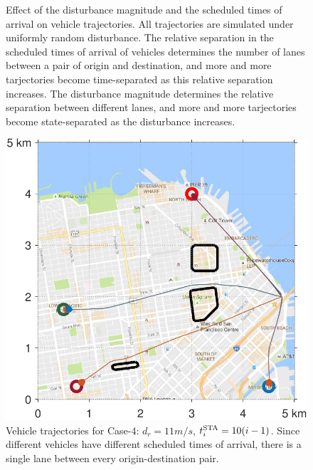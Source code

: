 \begin{figure}[!htb]
\begin{subfigure}{0.5\textwidth}
  \label{fig:sf_d11sep5}
\end{subfigure}%
\caption{Effect of the disturbance magnitude and the scheduled times of arrival on vehicle trajectories. All trajectories are simulated under uniformly random disturbance. The relative separation in the scheduled times of arrival of vehicles determines the number of lanes between a pair of origin and destination, and more and more tarjectories become time-separated as this relative separation increases. The disturbance magnitude determines the relative separation between different lanes, and more and more tarjectories become state-separated as the disturbance increases. }
\label{fig:trajectories_sf}
\end{figure}

\begin{figure}[t]
  \centering
  \includegraphics[width=\columnwidth]{figs/sf_d11sep10}
  \caption{Vehicle trajectories for Case-4: $d_r = 11m/s$, $t^\text{STA}_i = 10(i-1)$. Since different vehicles have different scheduled times of arrival, there is a single lane between every origin-destination pair.} 
  \label{fig:sf_d11sep10}
\end{figure}